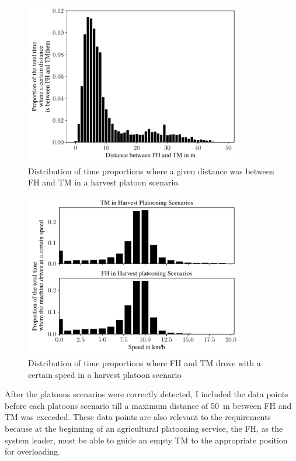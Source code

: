 \begin{figure}%
	\centering
	\includegraphics[width=0.85\textwidth]{figures/distanceHarvestScenario.pdf}
	\caption{Distribution of time proportions where a given distance was between \acf{FH} and \acf{TM} in a harvest platoon scenario.}%
	\label{fig:distance}%
\end{figure}
\begin{figure}%
	\centering
	\includegraphics[width=0.85\textwidth]{figures/speedHarvestScenario.pdf}
	\caption{Distribution of time proportions where \acf{FH} and \acf{TM} drove with a certain speed in a harvest platoon scenario}%
	\label{fig:speed}%
\end{figure}

After the platoons scenarios were correctly detected, I included the data points before each platoons scenario till a maximum distance of \SI{50}{\metre} between \ac{FH} and \ac{TM} was exceeded. These data points are also relevant to the requirements because at the beginning of an agricultural platooning service, the \ac{FH}, as the system leader, must be able to guide an empty \ac{TM} to the appropriate position for overloading.

